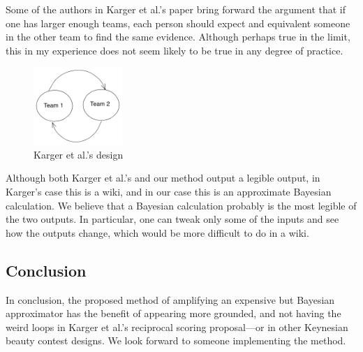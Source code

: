 \documentclass[]{article}
\begin{document}
Some of the authors in Karger et al.'s paper bring forward the argument
that if one has larger enough teams, each person should expect and
equivalent someone in the other team to find the same evidence. Although
perhaps true in the limit, this in my experience does not seem likely to
be true in any degree of practice.

\begin{figure}
\centering
\includegraphics[width=0.3\textwidth,height=\textheight]{diagrams/amplification-diagram-2.png}
\caption{Karger et al.'s design}
\end{figure}

Although both Karger et al.'s and our method output a legible output, in
Karger's case this is a wiki, and in our case this is an approximate
Bayesian calculation. We believe that a Bayesian calculation probably is
the most legible of the two outputs. In particular, one can tweak only
some of the inputs and see how the outputs change, which would be more
difficult to do in a wiki.

\hypertarget{conclusion}{%
\subsection{Conclusion}\label{conclusion}}

In conclusion, the proposed method of amplifying an expensive but
Bayesian approximator has the benefit of appearing more grounded, and
not having the weird loops in Karger et al.'s reciprocal scoring
proposal---or in other Keynesian beauty contest designs. We look forward
to someone implementing the method.
\end{document}

